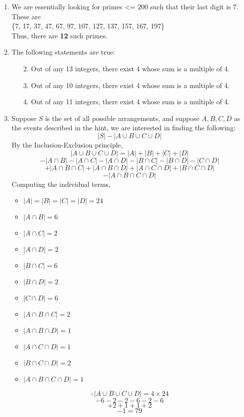 \documentclass[a4paper,12pt]{article} %
\begin{document}
\begin{enumerate}

\item We are essentially looking for primes <= 200 such that their last digit is 7. These are\\
	\{7, 17, 37, 47, 67, 97, 107, 127, 137, 157, 167, 197\}\\
	Thus, there are \textbf{12} such primes.

\item The following statements are true:
	\begin{enumerate}
		\item[2.] Out of any 13 integers, there exist 4 whose sum is a multiple of 4.
		\item[3.] Out of any 10 integers, there exist 4 whose sum is a multiple of 4.
		\item[4.] Out of any 11 integers, there exist 4 whose sum is a multiple of 4.
	\end{enumerate}
\item Suppose $S$ is the set of all possible arrangements, and suppose $A, B, C, D$ as the events described in the hint, we are interested in finding the following:
	$$ |S| - |A \cup B \cup C \cup D| $$
	By the Inclusion-Exclusion principle,\\
		$$ |A \cup B \cup C \cup D| = |A| + |B| + |C| + |D| $$
		$$ - |A \cap B| - |A \cap C| - |A \cap D| - |B \cap C| - |B \cap D| - |C \cap D| $$
		$$ + |A \cap B \cap C| + |A \cap B \cap D| + |A \cap C \cap D| + |B \cap C \cap D| $$
		$$ - |A \cap B \cap C \cap D| $$
	Computing the individual terms,
	\begin{itemize}
		\item $|A| = |B| = |C| = |D| = 24$
		\item $|A \cap B| = 6$
		\item $|A \cap C| = 2$
		\item $|A \cap D| = 2$
		\item $|B \cap C| = 6$
		\item $|B \cap D| = 2$
		\item $|C \cap D| = 6$
		\item $|A \cap B \cap C| = 2$
		\item $|A \cap B \cap D| = 1$
		\item $|A \cap C \cap D| = 1$
		\item $|B \cap C \cap D| = 2$
		\item $|A \cap B \cap C \cap D| = 1$
	\end{itemize}
	$$\therefore |A \cup B \cup C \cup D| = 4 \times 24 $$
	$$ - 6 - 2 - 2 - 6 - 2 - 6 $$
	$$ + 2 + 1 + 1 + 2 $$
	$$ - 1  = 79$$


\end{enumerate}
\end{document}
